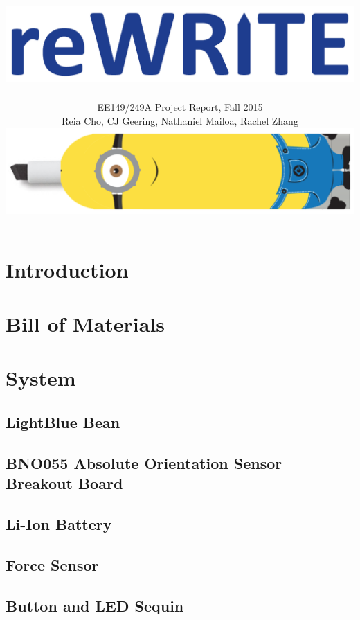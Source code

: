 \documentclass[12pt,journal]{IEEEtran}
\begin{document}
\title{\includegraphics[width=0.4\linewidth]{figures/rewrite}}

\author{EE149/249A Project Report, Fall 2015

Reia Cho, CJ Geering, Nathaniel Mailoa, Rachel Zhang

\includegraphics[width=0.5\linewidth]{figures/minion}}


\maketitle



\section{Introduction}


\section{Bill of Materials}


\section{System}
\subsection{LightBlue Bean}
\subsection{BNO055 Absolute Orientation Sensor Breakout Board}
\subsection{Li-Ion Battery}
\subsection{Force Sensor}
\subsection{Button and LED Sequin}
\end{document}
